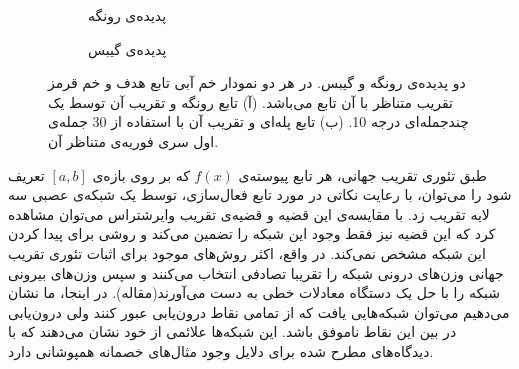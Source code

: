\documentclass[12pt,onecolumn,a4paper]{article}
\begin{document}
 \begin{figure}
    \centering
    \begin{subfigure}[b]{0.45\textwidth}
        \centering
        \caption{پدیده‌ی رونگه}
        \label{fig:runge}
    \end{subfigure}
    \hfill
    \begin{subfigure}[b]{0.45\textwidth}
        \centering
        \caption{پدیده‌ی گیبس}
        \label{fig:gibbs}
    \end{subfigure}
       \caption{دو پدیده‌ی رونگه و گیبس. در هر دو نمودار خم آبی تابع هدف و خم قرمز تقریب متناظر با آن تابع می‌باشد. (آ) تابع رونگه و تقریب آن توسط یک چندجمله‌ای درجه 10. (ب) تابع پله‌ای و تقریب آن با استفاده از 30 جمله‌ی اول سری فوریه‌ی متناظر آن.}
       \label{fig:runge_gibbs}
\end{figure}

طبق تئوری تقریب جهانی، هر تابع پیوسته‌ی $f(x)$ که بر روی بازه‌ی $[a,b]$ تعریف شود را می‌توان، با رعایت نکاتی در مورد تابع فعال‌سازی، توسط یک شبکه‌ی عصبی سه لایه تقریب زد. با مقایسه‌ی این قضیه و قضیه‌ی تقریب وایرشتراس می‌توان مشاهده کرد که این قضیه نیز فقط وجود این شبکه را تضمین می‌کند و روشی برای پیدا کردن این شبکه مشخص نمی‌کند. در واقع، اکثر روش‌های موجود برای اثبات تئوری تقریب جهانی وزن‌های درونی شبکه را تقریبا تصادفی انتخاب می‌کنند و سپس وزن‌های بیرونی شبکه را با حل یک دستگاه معادلات خطی به دست می‌آورند(مقاله). در اینجا، ما نشان می‌دهیم می‌توان شبکه‌هایی یافت که از تمامی نقاط درون‌یابی عبور کنند ولی درون‌یابی در بین این نقاط ناموفق باشد. این شبکه‌ها علائمی از خود نشان می‌دهند که با دیدگاه‌های مطرح شده برای دلایل وجود مثال‌های خصمانه همپوشانی دارد.
\end{document}
